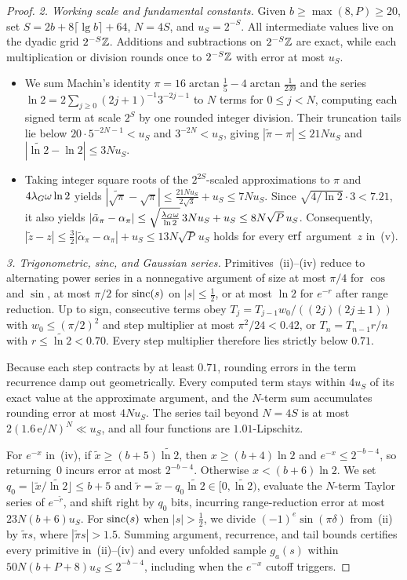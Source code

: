 \begin{proof}
\emph{2. Working scale and fundamental constants.}
Given $b\ge\max(8,P)\ge 20$, set $S=2b+8\lceil\lg b\rceil+64$, $N=4S$, and $u_S=2^{-S}$. All intermediate values live on the dyadic grid $2^{-S}\mathbb{Z}$. Additions and subtractions on $2^{-S}\mathbb{Z}$ are exact, while each multiplication or division rounds once to $2^{-S}\mathbb{Z}$ with error at most $u_S$.
\begin{itemize}[nosep,leftmargin=*]
  \item We sum Machin's identity $\pi=16\arctan\tfrac15-4\arctan\tfrac{1}{239}$ and the series $\ln 2=2\sum_{j\ge 0}(2j+1)^{-1}3^{-2j-1}$ to $N$ terms for $0\le j<N$, computing each signed term at scale $2^S$ by one rounded integer division. Their truncation tails lie below $20\cdot 5^{-2N-1}<u_S$ and $3^{-2N}<u_S$, giving $|\tilde\pi-\pi|\le 21N u_S$ and $|\widetilde{\ln 2}-\ln 2|\le 3N u_S$.

  \item Taking integer square roots of the $2^{2S}$-scaled approximations to $\pi$ and $4\lambda_G\omega\ln 2$ yields $|\widetilde{\sqrt\pi}-\sqrt\pi|\le\frac{21N u_S}{2\sqrt 3}+u_S\le 7N u_S$. Since $\sqrt{4/\ln 2}\cdot 3<7.21$, it also yields $|\tilde\alpha_\pi-\alpha_\pi|\le\sqrt{\frac{\lambda_G\omega}{\ln 2}}\,3N u_S+u_S\le 8N\sqrt{P}\,u_S$. Consequently, $|\tilde z-z|\le\tfrac32|\tilde\alpha_\pi-\alpha_\pi|+u_S\le 13N\sqrt{P}\,u_S$ holds for every $\operatorname{erf}$ argument~$z$ in~(v).
\end{itemize}

\emph{3. Trigonometric, sinc, and Gaussian series.}
Primitives~(ii)--(iv) reduce to alternating power series in a nonnegative argument of size at most $\pi/4$ for $\cos$ and $\sin$, at most $\pi/2$ for $\operatorname{sinc}(s)$ on $|s|\le\tfrac12$, or at most $\ln 2$ for $e^{-r}$ after range reduction. Up to sign, consecutive terms obey $T_j=T_{j-1}w_0/((2j)(2j\pm 1))$ with $w_0\le(\pi/2)^2$ and step multiplier at most $\pi^2/24<0.42$, or $T_n=T_{n-1}r/n$ with $r\le\widetilde{\ln 2}<0.70$. Every step multiplier therefore lies strictly below $0.71$.

Because each step contracts by at least $0.71$, rounding errors in the term recurrence damp out geometrically. Every computed term stays within $4u_S$ of its exact value at the approximate argument, and the $N$-term sum accumulates rounding error at most $4N u_S$. The series tail beyond $N=4S$ is at most $2(1.6\,\mathrm e/N)^N\ll u_S$, and all four functions are $1.01$-Lipschitz.

For $e^{-x}$ in~(iv), if $\tilde x\ge(b+5)\widetilde{\ln 2}$, then $x\ge(b+4)\ln 2$ and $e^{-x}\le 2^{-b-4}$, so returning~$0$ incurs error at most $2^{-b-4}$. Otherwise $x<(b+6)\ln 2$. We set $q_0=\lfloor\tilde x/\widetilde{\ln 2}\rfloor\le b+5$ and $\tilde r=\tilde x-q_0\widetilde{\ln 2}\in[0,\widetilde{\ln 2})$, evaluate the $N$-term Taylor series of $e^{-\tilde r}$, and shift right by $q_0$ bits, incurring range-reduction error at most $23N(b+6)u_S$. For $\operatorname{sinc}(s)$ when $|s|>\tfrac12$, we divide $(-1)^e\sin(\pi\delta)$ from~(ii) by $\tilde\pi s$, where $|\tilde\pi s|>1.5$. Summing argument, recurrence, and tail bounds certifies every primitive in~(ii)--(iv) and every unfolded sample $g_a(s)$ within $50N(b+P+8)u_S\le 2^{-b-4}$, including when the $e^{-x}$ cutoff triggers.


\end{proof}
